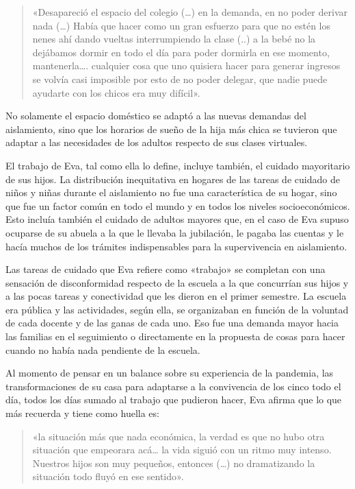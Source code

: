 \begin{quote}
«Desapareció el espacio del colegio (\ldots) en la demanda, en no poder derivar nada (\ldots) Había que hacer como un gran esfuerzo para que no estén los nenes ahí dando vueltas interrumpiendo la clase (..) a la bebé no la dejábamos dormir en todo el día para poder dormirla en ese momento, mantenerla\ldots. cualquier cosa que uno quisiera hacer para generar ingresos se volvía casi imposible por esto de no poder delegar, que nadie puede ayudarte con los chicos era muy difícil».
\end{quote}

No solamente el espacio doméstico se adaptó a las nuevas demandas del aislamiento, sino que los horarios de sueño de la hija más chica se tuvieron que adaptar a las necesidades de los adultos respecto de sus clases virtuales.

El trabajo de Eva, tal como ella lo define, incluye también, el cuidado mayoritario de sus hijos. La distribución inequitativa en hogares de las tareas de cuidado de niños y niñas durante el aislamiento no fue una característica de su hogar, sino que fue un factor común en todo el mundo y en todos los niveles socioeconómicos. Esto incluía también el cuidado de adultos mayores que, en el caso de Eva supuso ocuparse de su abuela a la que le llevaba la jubilación, le pagaba las cuentas y le hacía muchos de los trámites indispensables para la supervivencia en aislamiento.

Las tareas de cuidado que Eva refiere como «trabajo» se completan con una sensación de disconformidad respecto de la escuela a la que concurrían sus hijos y a las pocas tareas y conectividad que les dieron en el primer semestre. La escuela era pública y las actividades, según ella, se organizaban en función de la voluntad de cada docente y de las ganas de cada uno. Eso fue una demanda mayor hacia las familias en el seguimiento o directamente en la propuesta de cosas para hacer cuando no había nada pendiente de la escuela.

Al momento de pensar en un balance sobre su experiencia de la pandemia, las transformaciones de su casa para adaptarse a la convivencia de los cinco todo el día, todos los días sumado al trabajo que pudieron hacer, Eva afirma que lo que más recuerda y tiene como huella es:

\begin{quote}
«la situación más que nada económica, la verdad es que no hubo otra situación que empeorara acá\ldots{} la vida siguió con un ritmo muy intenso. Nuestros hijos son muy pequeños, entonces (\ldots) no dramatizando la situación todo fluyó en ese sentido».
\end{quote}

